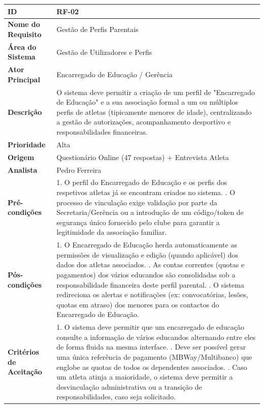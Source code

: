 {\begin{xltabular}{\textwidth}{|l|X|}
\textbf{ID} & RF-02 \\ \hline
\textbf{Nome do Requisito} & Gestão de Perfis Parentais \\ \hline
\textbf{Área do Sistema} & Gestão de Utilizadores e Perfis \\ \hline
\textbf{Ator Principal} & Encarregado de Educação / Gerência \\ \hline
\textbf{Descrição} & O sistema deve permitir a criação de um perfil de "Encarregado de Educação" e a sua associação formal a um ou múltiplos perfis de atletas (tipicamente menores de idade), centralizando a gestão de autorizações, acompanhamento desportivo e responsabilidades financeiras. \\ \hline
\textbf{Prioridade} & Alta \\ \hline
\textbf{Origem} & Questionário Online (47 respostas) + Entrevista Atleta \\ \hline
\textbf{Analista} & Pedro Ferreira \\ \hline
\textbf{Pré-condições} & 1. O perfil do Encarregado de Educação e os perfis dos respetivos atletas já se encontram criados no sistema. . O processo de vinculação exige validação por parte da Secretaria/Gerência ou a introdução de um código/token de segurança único fornecido pelo clube para garantir a legitimidade da associação familiar. \\ \hline
\textbf{Pós-condições} & 1. O Encarregado de Educação herda automaticamente as permissões de visualização e edição (quando aplicável) dos dados dos atletas associados. . As contas correntes (quotas e pagamentos) dos vários educandos são consolidadas sob a responsabilidade financeira deste perfil parental. . O sistema redireciona os alertas e notificações (ex: convocatórias, lesões, quotas em atraso) dos menores para os contactos do Encarregado de Educação. \\ \hline
\textbf{Critérios de Aceitação} & 1. O sistema deve permitir que um encarregado de educação consulte a informação de vários educandos alternando entre eles de forma fluida na mesma interface. . Deve ser possível gerar uma única referência de pagamento (MBWay/Multibanco) que englobe as quotas de todos os dependentes associados. . Caso um atleta atinja a maioridade, o sistema deve permitir a desvinculação administrativa ou a transição de responsabilidades, caso seja solicitado. \\
\end{xltabular}
}


